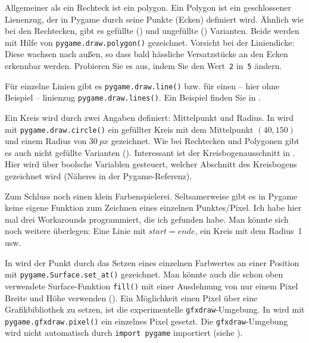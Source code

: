 Allgemeiner als ein Rechteck ist ein \Gls{polygon}. Ein Polygon ist ein geschlossener Lienenzug, der in Pygame durch seine Punkte (Ecken) definiert wird. Ähnlich wie bei den Rechtecken, gibt es gefüllte () und ungefüllte () Varianten. Beide werden mit Hilfe von \texttt{pygame.draw.polygon()} gezeichnet. Vorsicht bei der Liniendicke: Diese wachsen nach außen, so dass bald hässliche Versatzstücke an den Ecken erkennbar werden. Probieren Sie es aus, indem Sie den Wert~\texttt{2} in~\texttt{5} ändern.

Für einzelne Linien gibt es \texttt{pygame.draw.line()} bzw. für einen -- hier ohne Beispiel -- \gls{linienzug} \texttt{pygame.draw.lines()}. Ein Beispiel finden Sie in .

Ein Kreis wird durch zwei Angaben definiert: Mittelpunkt und Radius. In  wird mit \texttt{pygame.draw.circle()} ein gefüllter Kreis mit dem Mittelpunkt $(40, 150)$ und einem Radius von $30~px$ gezeichnet. Wie bei Rechtecken und Polygonen gibt es auch nicht gefüllte Varianten (). Interessant ist der Kreisbogenausschnitt in . Hier wird über boolsche Variablen gesteuert, welcher Abschnitt des Kreisbogens gezeichnet wird (Näheres in der Pygame-Referenz).

Zum Schluss noch einen klein Farbenspielerei. Seltsamerweise gibt es in Pygame keine eigene Funktion zum Zeichnen eines einzelnen Punktes/Pixel. Ich habe hier mal drei Workarounds programmiert, die ich gefunden habe. Man könnte sich noch weitere überlegen: Eine Linie mit $start=ende$, ein Kreis mit dem Radius~1 usw.

In  wird der Punkt durch das Setzen eines einzelnen Farbwertes an einer Position mit \texttt{pygame.Surface.set\_at()} gezeichnet. Man könnte auch die schon oben verwendete Surface-Funktion \texttt{fill()} mit einer Ausdehnung von nur einem Pixel Breite und Höhe verwenden (). Ein Möglichkeit einen Pixel über eine Grafikbibliothek zu setzen, ist die experimentelle \texttt{gfxdraw}-Umgebung. In  wird mit \texttt{pygame.gfxdraw.pixel()} ein einzelnes Pixel gesetzt. Die \texttt{gfxdraw}-Umgebung wird nicht automatisch durch \texttt{import pygame} importiert (siehe ).

